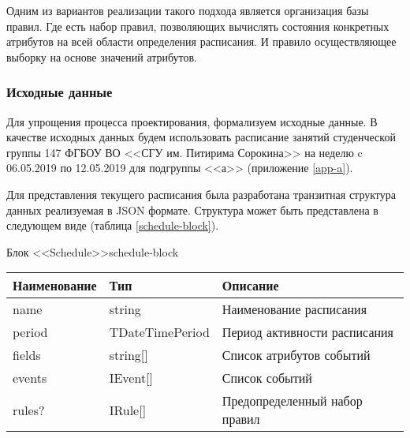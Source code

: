 Одним из вариантов реализации такого подхода является организация базы правил.
Где есть набор правил, позволяющих вычислять состояния конкретных атрибутов на всей области определения расписания.
И правило осуществляющее выборку на основе значений атрибутов.

\subsubsection{Исходные данные}

Для упрощения процесса проектирования, формализуем исходные данные.
В качестве исходных данных будем использовать расписание занятий студенческой группы 147 ФГБОУ ВО <<СГУ им. Питирима Сорокина>> на неделю c 06.05.2019 по 12.05.2019 для подгруппы <<а>> (приложение \ref{app-a}).

Для представления текущего расписания была разработана транзитная структура данных реализуемая в JSON формате.
Структура может быть представлена в следующем виде (таблица \ref{schedule-block}).

\begin{tbl}{Блок <<Schedule>>}{schedule-block}
  \begin{tabularx}{\textwidth}{| p{3cm} | p{3cm} | X |}
  \hline Наименование & Тип             & Описание                      \\
  \hline name         & string          & Наименование расписания       \\
  \hline period       & TDateTimePeriod & Период активности расписания  \\
  \hline fields       & string[]        & Список атрибутов событий      \\
  \hline events       & IEvent[]        & Список событий                \\
  \hline rules?       & IRule[]         & Предопределенный набор правил \\
  \hline
  \end{tabularx}
\end{tbl}

